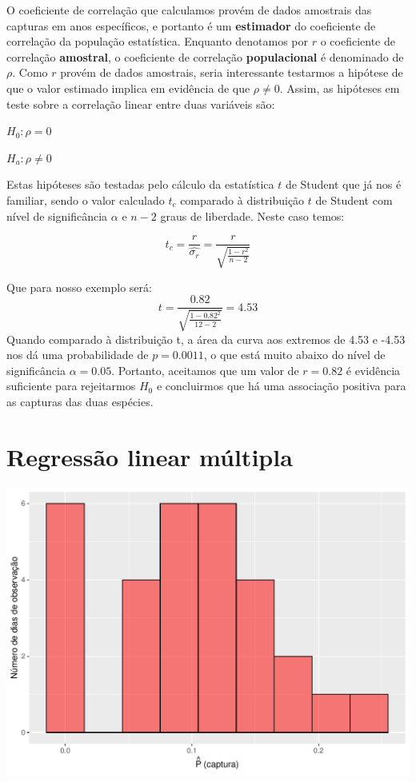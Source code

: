 \documentclass[
]{book}
\begin{document}
O coeficiente de correlação que calculamos provém de dados amostrais das capturas em anos específicos, e portanto é um \textbf{estimador} do coeficiente de correlação da população estatística. Enquanto denotamos por \(r\) o coeficiente de correlação \textbf{amostral}, o coeficiente de correlação \textbf{populacional} é denominado de \(\rho\). Como \(r\) provém de dados amostrais, seria interessante testarmos a hipótese de que o valor estimado implica em evidência de que \(\rho \ne 0\). Assim, as hipóteses em teste sobre a correlação linear entre duas variáveis são:

\(H_0: \rho = 0\)

\(H_a: \rho \ne 0\)

Estas hipóteses são testadas pelo cálculo da estatística \(t\) de Student que já nos é familiar, sendo o valor calculado \(t_c\) comparado à distribuição \(t\) de Student com nível de significância \(\alpha\) e \(n-2\) graus de liberdade. Neste caso temos:

\[t_c = \frac{r}{\hat{\sigma_r}} = \frac{r}{\sqrt{\frac{1-r^2}{n-2}}}\]

Que para nosso exemplo será:
\[t = \frac{0.82}{\sqrt{\frac{1-0.82^2}{12-2}}} = 4.53\]
Quando comparado à distribuição t, a área da curva aos extremos de 4.53 e -4.53 nos dá uma probabilidade de \(p = 0.0011\), o que está muito abaixo do nível de significância \(\alpha = 0.05\). Portanto, aceitamos que um valor de \(r = 0.82\) é evidência suficiente para rejeitarmos \(H_0\) e concluirmos que há uma associação positiva para as capturas das duas espécies.

\hypertarget{regresmultipla}{%
\chapter{Regressão linear múltipla}\label{regresmultipla}}

\begin{center}\includegraphics{probest-cambientais_files/figure-latex/unnamed-chunk-173-1} \end{center}
\end{document}
